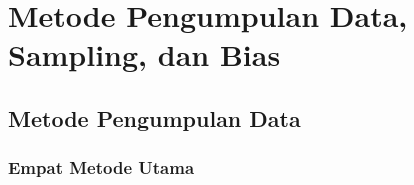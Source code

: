 \documentclass[
  indonesian,
  letterpaper,
]{book}
\begin{document}

\chapter{Metode Pengumpulan Data, Sampling, dan
Bias}\label{metode-pengumpulan-data-sampling-dan-bias}

\section{Metode Pengumpulan Data}\label{metode-pengumpulan-data}

\subsection{Empat Metode Utama}\label{empat-metode-utama}
\end{document}
